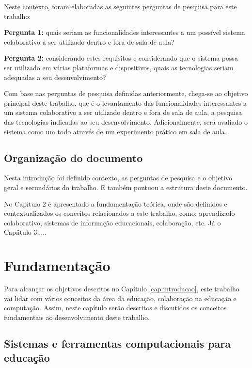 Neste contexto, foram elaboradas as seguintes perguntas de pesquisa para este trabalho:

\textbf{Pergunta 1:} quais seriam as funcionalidades interessantes a um possível sistema colaborativo a ser utilizado dentro e fora de sala de aula?

\textbf{Pergunta 2:} considerando estes requisitos e considerando que o sistema possa ser utilizado em várias plataformas e dispositivos, quais as tecnologias seriam adequadas a seu desenvolvimento?

Com base nas perguntas de pesquisa definidas anteriormente, chega-se ao objetivo principal deste trabalho, que é o levantamento das funcionalidades interessantes a um sistema colaborativo a ser utilizado dentro e fora de sala de aula, a pesquisa das tecnologias indicadas ao seu desenvolvimento. Adicionalmente, será avaliado o sistema como um todo através de um experimento prático em sala de aula.

\section{Organização do documento}

Nesta introdução foi definido contexto, as perguntas de pesquisa e o objetivo geral e secundários do trabalho. E também pontuou a estrutura deste documento.

No Capítulo 2 é apresentado a fundamentação teórica, onde são definidos e contextualizados os conceitos relacionados a este trabalho, como: aprendizado colaborativo, sistemas de informação educacionais, colaboração, etc. Já o Capíitulo 3,....


\chapter{Fundamentação}
\label{cap:fundamentacao}

Para alcançar os objetivos descritos no Capítulo \ref{cap:introducao}, este trabalho vai lidar com vários conceitos da área da educação, colaboração na educação e computação. Assim, neste capítulo serão descritos e discutidos os conceitos fundamentais ao desenvolvimento deste trabalho.

\section{Sistemas e ferramentas computacionais para educação}



